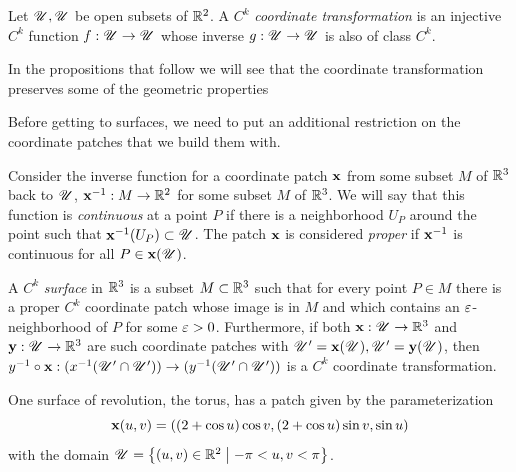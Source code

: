\begin{defn}
  Let $\mathscr{U}, \mathscr{U}$ be open subsets of $\mathbb{R}^2$. A $C^k$ \emph{coordinate transformation} is an injective $C^k$ function $f: \mathscr{U} \to \mathscr{U}$ whose inverse $g:\mathscr{U} \to \mathscr{U}$ is also of class $C^k$. 
\end{defn}

In the propositions that follow we will see that the coordinate transformation preserves some of the geometric properties 


Before getting to surfaces, we need to put an additional restriction on the coordinate patches that we build them with.

\begin{defn}
  Consider the inverse function for a coordinate patch $\mathbf{x}$ from some subset $M$ of $\mathbb{R}^3$ back to $\mathscr{U}$, $\mathbf{x}^{-1}: M \to \mathbb{R}^2$ for some subset $M$ of $\mathbb{R}^3$. We will say that this function is \emph{continuous} at a point $P$ if there is a neighborhood $U_P$ around the point such that $\mathbf{x}^{-1}(U_P)\subset \mathscr{U}$. The patch $\mathbf{x}$ is considered \emph{proper} if $\mathbf{x}^{-1}$ is continuous for all $P \in \mathbf{x}(\mathscr{U})$.
\end{defn}

\begin{defn}
  A $C^k$ \emph{surface} in $\mathbb{R}^3$ is a subset $M \subset \mathbb{R}^3$ such that for every point $P \in M$ there is a proper $C^k$ coordinate patch whose image is in $M$ and which contains an $\varepsilon$-neighborhood of $P$ for some $\varepsilon > 0$. Furthermore, if both $\mathbf{x}: \mathscr{U} \to \mathbb{R}^3$ and $\mathbf{y}: \mathscr{U} \to \mathbb{R}^3$ are such coordinate patches with $\mathscr{U}^\prime = \mathbf{x}(\mathscr{U}), \mathscr{U}^\prime = \mathbf{y}(\mathscr{U})$, then $y^{-1} \circ \mathbf{x}: (x^{-1}(\mathscr{U}^\prime \cap \mathscr{U}^\prime)) \to (y^{-1}(\mathscr{U}^\prime \cap \mathscr{U}^\prime))$ is a $C^k$ coordinate transformation.
\end{defn}





One surface of revolution, the torus, has a patch given by the parameterization
\[
  \mathbf{x}(u, v) = ((2 + \cos u)\cos v, (2 + \cos u) \sin v, \sin u)
\]
with the domain $\mathscr{U} = \left\{(u, v) \in \mathbb{R}^2\;\middle\vert\;-\pi < u, v < \pi\right\}$.


